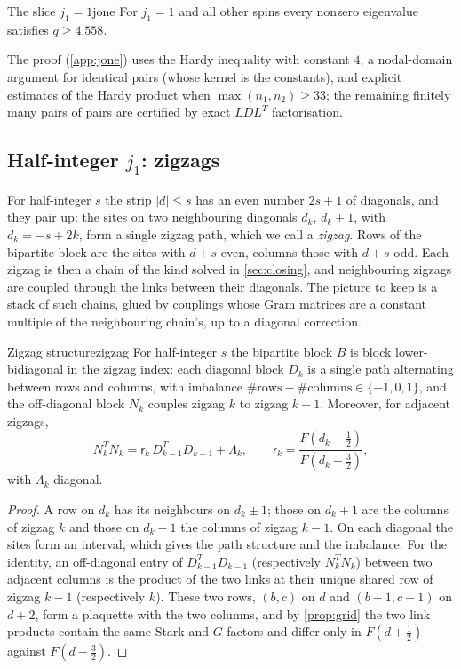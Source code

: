 \begin{theorem}{The slice \texorpdfstring{$j_1=1$}{j1 = 1}}{jone}
For $j_1=1$ and all other spins every nonzero eigenvalue satisfies $q\ge4.558$.
\end{theorem}

The proof (\cref{app:jone}) uses the Hardy inequality with constant $4$, a nodal-domain
argument for identical pairs (whose kernel is the constants), and explicit estimates of
the Hardy product when $\max(n_1,n_2)\ge33$; the remaining finitely many pairs of pairs
are certified by exact $LDL^T$ factorisation.

\subsection{Half-integer \texorpdfstring{$j_1$}{j1}: zigzags}

For half-integer $s$ the strip $|d|\le s$ has an even number $2s+1$ of diagonals, and
they pair up: the sites on two neighbouring diagonals $d_k$, $d_k+1$, with
$d_k=-s+2k$, form a single zigzag path, which we call a \emph{zigzag}. Rows of the
bipartite block are the sites with $d+s$ even, columns those with $d+s$ odd. Each
zigzag is then a chain of the kind solved in \cref{sec:closing}, and neighbouring
zigzags are coupled through the links between their diagonals. The picture to keep is
a stack of such chains, glued by couplings whose Gram matrices are a constant multiple
of the neighbouring chain's, up to a diagonal correction.

\begin{proposition}{Zigzag structure}{zigzag}
For half-integer $s$ the bipartite block $B$ is block lower-bidiagonal in the zigzag
index: each diagonal block $D_k$ is a single path alternating between rows and columns,
with imbalance $\#\mathrm{rows}-\#\mathrm{columns}\in\{-1,0,1\}$, and the off-diagonal
block $N_k$ couples zigzag $k$ to zigzag $k-1$. Moreover, for adjacent zigzags,
\[
  N_k^TN_k=\mathsf r_k\,D_{k-1}^TD_{k-1}+\Lambda_k,\qquad \mathsf r_k=\frac{F(d_k-\frac12)}{F(d_k-\frac32)},
\]
with $\Lambda_k$ diagonal.
\end{proposition}

\begin{proof}
A row on $d_k$ has its neighbours on $d_k\pm1$; those on $d_k+1$ are the columns of
zigzag $k$ and those on $d_k-1$ the columns of zigzag $k-1$. On each diagonal the sites
form an interval, which gives the path structure and the imbalance. For the identity,
an off-diagonal entry of $D_{k-1}^TD_{k-1}$ (respectively $N_k^TN_k$) between two
adjacent columns is the product of the two links at their unique shared row of zigzag
$k-1$ (respectively $k$). These two rows, $(b,c)$ on $d$ and $(b+1,c-1)$ on $d+2$, form
a plaquette with the two columns, and by \cref{prop:grid} the two link products contain
the same Stark and $G$ factors and differ only in $F(d+\frac12)$ against $F(d+\frac32)$.
\end{proof}

